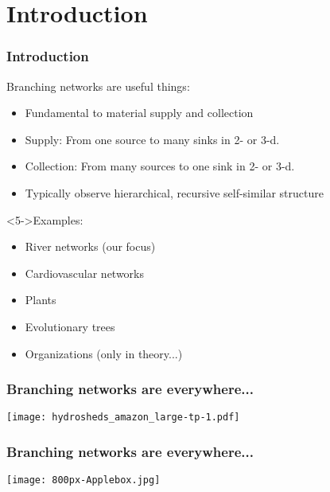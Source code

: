 \section{Introduction}

\begin{frame}[label=]
  \frametitle{Introduction}

  \begin{block}{Branching networks are useful things:}
    \begin{itemize}
    \item<1-> Fundamental to material \alert{supply and collection}
    \item<2-> \alert{Supply:} From one source to many sinks in 2- or 3-d.
    \item<3-> \alert{Collection:} From many sources to one sink in 2- or 3-d.
    \item<4-> Typically observe hierarchical, recursive self-similar structure
    \end{itemize}
  \end{block}

  \begin{block}<5->{Examples:}
    \begin{itemize}
    \item<6-> River networks (our focus)
    \item<7-> Cardiovascular networks
    \item<8-> Plants
    \item<9-> Evolutionary trees
    \item<10-> Organizations (only in theory...)
    \end{itemize}
  \end{block}

\end{frame}

\begin{frame}[label=]
  \frametitle{Branching networks are everywhere...}

  \begin{center}
    \texttt{[image: hydrosheds\_amazon\_large-tp-1.pdf]}\\
    {\tiny {}}
  \end{center}

\end{frame}

\begin{frame}[label=]
  \frametitle{Branching networks are everywhere...}

  \begin{center}
    \texttt{[image: 800px-Applebox.jpg]}\\
    {\tiny {}}
  \end{center}

\end{frame}

